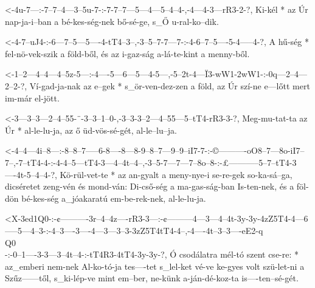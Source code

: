 
  {<-4u-7---:-7--7--4---3--5u-7-:-7-7--7---5---4---5--4--4-,-4---4-3---rR3-2-?,}
  {  Ki-kél * az Úr nap-ja-i--ban a bé-kes-ség-nek bő-sé-ge, s_Ő u-ral-ko--dik.}



  {<-4-7--uJ4-:-6---7--5---5----4-tT4--3--,-3--5--7-7---7-:-4-6--7--5----5-4-----4-?,}
  {  A hű-ség * fel-nö-vek-szik a föld-ből, és az i-gaz-ság a-lá-te-kint a menny-ből.}



  {<-1--2---4--4---4--5z-5---:-4----5---6---5---4-5---,-5--2t-4---Ï3-wW1-2wW1-:-0q---2--4---2--2-?,}
  {  Ví-gad-ja-nak az e--gek * s_ör-ven-dez-zen a föld, az Úr szí-ne e---lőtt   mert im-már el-jött.}

  {<-3---3--3---2--4--55-¨-3--3--1--0-,-3--3-3--2---4--55---5--tT4-rR3-3-?,}
  {  Meg-mu-tat-ta az Úr * al-le-lu-ja, az ő üd-vös-sé-gét, al-le--lu--ja.}


  {<-4--4---4i--8---:-8--8--7-----6-8----8---8-9--8--7---9--9--iI7-7-:-©----------oO8--7---8o-iI7--7--,-7--tT4-4-:-4-4--5---tT4-3---4--4t--4--,-3--5-7---7---7--8o--8-:-£-----------5--7--tT4-3----4t-5--4--4-?,}
  {  Kö-rül-vet-te  * az an-gyalt a meny-nye-i se-re-gek so-ka-sá--ga, dicséretet zeng-vén és mond-ván: Di-cső-ség a ma-gas-ság-ban Is-ten-nek, és a föl-dön bé-kes-ség a_jóakaratú em-be-rek-nek, al-le-lu-ja.}



  {<X-3ed1Q0-:-¢----------3r--4--4z----rR3-3---:-¢---------4---3---4--4t-3y-3y-4zZ5T4-4---6-----5---4--3-:-4--3----3----4---3---3--3-3zZ5T4tT4-4--,-4----4t--3--3----eE2-q\\Q0\\-:-0--1----3-3---3--4t--4-:-tT4R3-4tT4-3y-3y-?,}
  {   Ó        csodálatra mél-tó szent cse-re: * az_emberi nem-nek Al-ko-tó-ja tes----tet s_lel-ket vé-ve  ke-gyes volt szü-let-ni a Szűz------től, s_ki-lép-ve mint em--ber,      ne-künk a-ján-dé-koz-ta  is----ten--sé-gét.}

